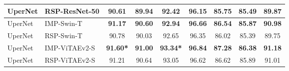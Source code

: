\documentclass[10pt, journal,twoside]{IEEEtran}
\begin{document}
\begin{table*}[t]
\begin{tabular}{l|l|c|c|c|c|c|c|c}
  UperNet & RSP-ResNet-50 &  90.61   &  89.94 &  \bfseries 92.42  &   \bfseries 96.15    & 85.75 & 85.49 & \bfseries 89.87 \\
  \hline
  UperNet & IMP-Swin-T & \bfseries 91.17 & \bfseries 90.60     &  \bfseries 92.94    & \bfseries 96.66     & \bfseries 86.54 & \bfseries 85.87 & \bfseries 90.98\\
  UperNet & RSP-Swin-T &  90.78 &  90.03     &   92.65    &  96.35     & 86.02 & 85.39 & 89.75  \\
  \hline
  UperNet & IMP-ViTAEv2-S & \bfseries  91.60\textbf{*}    & \bfseries  91.00    & \bfseries  93.34\textbf{*}    & \bfseries  96.84   & \bfseries 87.28 & \bfseries 86.38 & \bfseries 91.18 \\
  UperNet & RSP-ViTAEv2-S &   91.21    &   90.64    &   93.05    &   96.62   &  86.62 & 85.89 & 91.01 \\
  \hline
\end{tabular}
\label{seg_potsd}
\end{table*}
\end{document}
